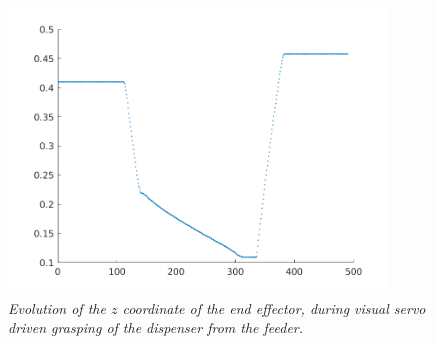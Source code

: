 \begin{figure}
	\centering
	\includegraphics[width=0.9\textwidth]{Images/experimental_data/grasping_z.png}
	\caption{\textit{Evolution of the $z$ coordinate of the end effector, during visual servo driven grasping of the dispenser from the feeder.}}
	\label{fig:graspingZ}
\end{figure}






